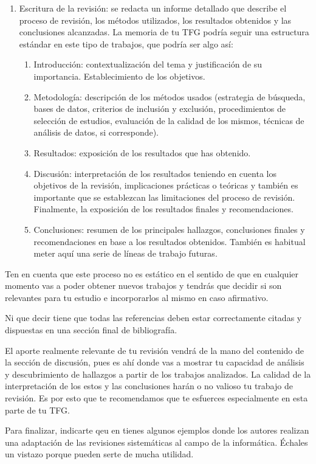 \begin{enumerate}
\item Escritura de la revisión: se redacta un informe detallado que describe el proceso de revisión, los métodos utilizados, los resultados obtenidos y las conclusiones alcanzadas. La memoria de tu TFG podría seguir una estructura estándar en este tipo de trabajos, que podría ser algo así:

\begin{enumerate}
\item Introducción: contextualización del tema y justificación de su importancia. Establecimiento de los objetivos.
\item Metodología: descripción de los métodos usados (estrategia de búsqueda, bases de datos, criterios de inclusión y exclusión, procedimientos de selección de estudios,  evaluación de la calidad de los mismos, técnicas de análisis de datos, si corresponde).
\item Resultados: exposición de los resultados que has obtenido.
\item Discusión: interpretación de los resultados teniendo en cuenta los objetivos de la revisión, implicaciones prácticas o teóricas y también es importante que se establezcan las limitaciones del proceso de revisión. Finalmente, la exposición de los resultados finales y recomendaciones. 
\item Conclusiones: resumen de los principales hallazgos, conclusiones finales  y recomendaciones en base a los resultados obtenidos. También es habitual meter aquí una serie de líneas de trabajo futuras. 
\end{enumerate}
\end{enumerate}

Ten en cuenta que este proceso no es estático en el sentido de que en cualquier momento vas a poder obtener nuevos trabajos y tendrás que decidir si son relevantes para tu estudio e incorporarlos al mismo en caso afirmativo.

Ni que decir tiene que todas las referencias deben estar correctamente citadas y dispuestas en una sección final de bibliografía.

El aporte realmente relevante de tu revisión vendrá de la mano del contenido de la sección de discusión, pues es ahí donde vas a mostrar tu capacidad de análisis y descubrimiento de hallazgos a partir de los trabajos analizados. La calidad de la interpretación de los estos y las conclusiones harán o no valioso tu trabajo de revisión. Es por esto que te recomendamos que te esfuerces especialmente en esta parte de tu TFG. 

Para finalizar, indicarte qeu en \cite{carrera2022angela, kofod2022anders,silva2016rodrigo} tienes algunos ejemplos donde los autores realizan una adaptación de las revisiones sistemáticas al campo de la informática. Échales un vistazo porque pueden serte de mucha utilidad.

